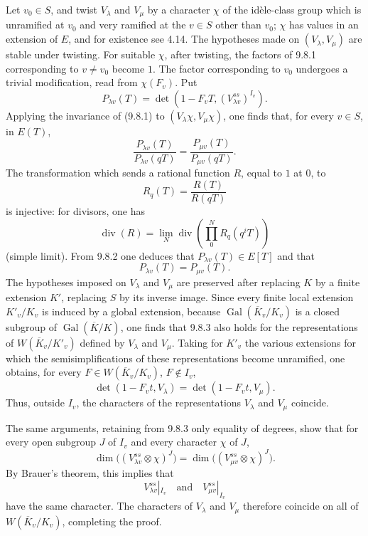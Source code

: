 \documentclass[10pt]{article}
\newcommand{\Gal}{\operatorname{Gal}}
\providecommand{\Gal}{\operatorname{Gal}}
\providecommand{\Gal}{\operatorname{Gal}}
\providecommand{\Gal}{\operatorname{Gal}}
\providecommand{\Gal}{\operatorname{Gal}}
\begin{document}
Let $v_0\in S$, and twist $V_\lambda$ and $V_\mu$ by a character $\chi$ of the idèle-class group which is unramified at $v_0$ and very ramified at the $v\in S$ other than $v_0$; $\chi$ has values in an extension of $E$, and for existence see 4.14. The hypotheses made on $(V_\lambda,V_\mu)$ are stable under twisting. For suitable $\chi$, after twisting, the factors of 9.8.1 corresponding to $v\ne v_0$ become $1$. The factor corresponding to $v_0$ undergoes a trivial modification, read from $\chi(F_v)$. Put
\[
P_{\lambda v}(T)=\det(1-F_vT,(V_{\lambda v}^{ss})^{I_v}).
\]
Applying the invariance of (9.8.1) to $(V_\lambda\chi,V_\mu\chi)$, one finds that, for every $v\in S$, in $E(T)$,
\[
\tag{9.8.2}
\frac{P_{\lambda v}(T)}{P_{\lambda v}(qT)}=
\frac{P_{\mu v}(T)}{P_{\mu v}(qT)}.
\]
The transformation which sends a rational function $R$, equal to $1$ at $0$, to
\[
R_q(T)=\frac{R(T)}{R(qT)}
\]
is injective: for divisors, one has
\[
\operatorname{div}(R)=\lim_N \operatorname{div}\left(\prod_{0}^{N}R_q(q^iT)\right)
\]
(simple limit). From 9.8.2 one deduces that $P_{\lambda v}(T)\in E[T]$ and that
\[
\tag{9.8.3}
P_{\lambda v}(T)=P_{\mu v}(T).
\]
The hypotheses imposed on $V_\lambda$ and $V_\mu$ are preserved after replacing $K$ by a finite extension $K'$, replacing $S$ by its inverse image. Since every finite local extension $K'_v/K_v$ is induced by a global extension, because $\Gal(\overline K_v/K_v)$ is a closed subgroup of $\Gal(\overline K/K)$, one finds that 9.8.3 also holds for the representations of $W(\overline K_v/K'_v)$ defined by $V_\lambda$ and $V_\mu$. Taking for $K'_v$ the various extensions for which the semisimplifications of these representations become unramified, one obtains, for every $F\in W(\overline K_v/K_v)$, $F\notin I_v$,
\[
\det(1-F_vt,V_\lambda)=\det(1-F_vt,V_\mu).
\]
Thus, outside $I_v$, the characters of the representations $V_\lambda$ and $V_\mu$ coincide.

The same arguments, retaining from 9.8.3 only equality of degrees, show that for every open subgroup $J$ of $I_v$ and every character $\chi$ of $J$,
\[
\dim\bigl((V_{\lambda v}^{ss}\otimes\chi)^J\bigr)
=
\dim\bigl((V_{\mu v}^{ss}\otimes\chi)^J\bigr).
\]
By Brauer's theorem, this implies that
\[
V_{\lambda v}^{ss}|_{I_v}\quad\text{and}\quad V_{\mu v}^{ss}|_{I_v}
\]
have the same character. The characters of $V_\lambda$ and $V_\mu$ therefore coincide on all of $W(\overline K_v/K_v)$, completing the proof.
\end{document}
